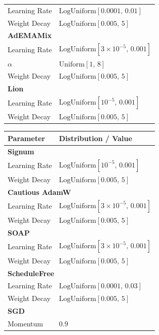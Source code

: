 \begin{table}[h]
\begin{minipage}[t]{0.48\textwidth}
\begin{tabular}{@{}ll@{}}
\quad Learning Rate & $\mathrm{LogUniform}[0.0001,\,0.01]$ \\
\quad Weight Decay & $\mathrm{LogUniform}[0.005,\,5]$ \\
\midrule
\multicolumn{2}{l}{\textbf{AdEMAMix}} \\
\quad Learning Rate & $\mathrm{LogUniform}[3 \!\times\! 10^{-5},\,0.001]$ \\
\quad $\alpha$ & $\mathrm{Uniform}[1,\,8]$ \\
\quad Weight Decay & $\mathrm{LogUniform}[0.005,\,5]$ \\
\midrule
\multicolumn{2}{l}{\textbf{Lion}} \\
\quad Learning Rate & $\mathrm{LogUniform}[10^{-5},\,0.001]$ \\
\quad Weight Decay & $\mathrm{LogUniform}[0.005,\,5]$ \\
\bottomrule
\end{tabular}
\end{minipage}
\hfill
\begin{minipage}[t]{0.48\textwidth}
\vspace{0pt}
\begin{tabular}{@{}ll@{}}
\toprule
Parameter & Distribution / Value \\
\midrule
\multicolumn{2}{l}{\textbf{Signum}} \\
\quad Learning Rate & $\mathrm{LogUniform}[10^{-5},\,0.001]$ \\
\quad Weight Decay & $\mathrm{LogUniform}[0.005,\,5]$ \\
\midrule
\multicolumn{2}{l}{\textbf{Cautious AdamW}} \\
\quad Learning Rate & $\mathrm{LogUniform}[3 \!\times\! 10^{-5},\,0.001]$ \\
\quad Weight Decay & $\mathrm{LogUniform}[0.005,\,5]$ \\
\midrule
\multicolumn{2}{l}{\textbf{SOAP}} \\
\quad Learning Rate & $\mathrm{LogUniform}[3 \!\times\! 10^{-5},\,0.001]$ \\
\quad Weight Decay & $\mathrm{LogUniform}[0.005,\,5]$ \\
\midrule
\multicolumn{2}{l}{\textbf{ScheduleFree}} \\
\quad Learning Rate & $\mathrm{LogUniform}[0.0001,\,0.03]$ \\
\quad Weight Decay & $\mathrm{LogUniform}[0.005,\,5]$ \\
\midrule
\multicolumn{2}{l}{\textbf{SGD}} \\
\quad Momentum & $0.9$ \\

\end{tabular}
\end{minipage}
\end{table}
